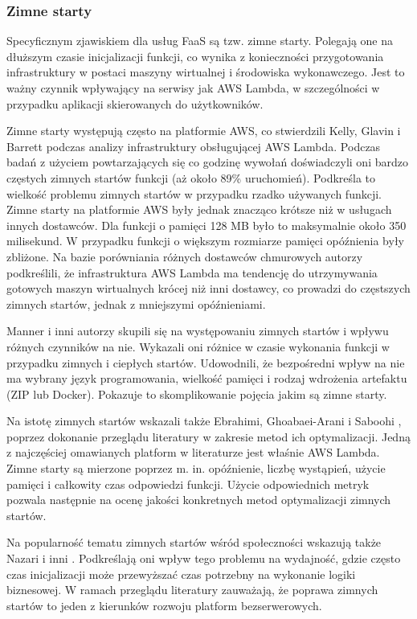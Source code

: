 \subsubsection*{Zimne starty}

Specyficznym zjawiskiem dla usług FaaS są tzw. zimne starty. 
Polegają one na dłuższym czasie inicjalizacji funkcji, co wynika z konieczności przygotowania infrastruktury w postaci maszyny wirtualnej i środowiska wykonawczego. 
Jest to ważny czynnik wpływający na serwisy jak AWS Lambda, w szczególności w przypadku aplikacji skierowanych do użytkowników.

Zimne starty występują często na platformie AWS, co stwierdzili Kelly, Glavin i Barrett \cite{9284261} podczas analizy infrastruktury obsługującej AWS Lambda. 
Podczas badań z użyciem powtarzających się co godzinę wywołań doświadczyli oni bardzo częstych zimnych startów funkcji (aż około 89\% uruchomień). 
Podkreśla to wielkość problemu zimnych startów w przypadku rzadko używanych funkcji. 
Zimne starty na platformie AWS były jednak znacząco krótsze niż w usługach innych dostawców. 
Dla funkcji o pamięci 128 MB było to maksymalnie około 350 milisekund. 
W przypadku funkcji o większym rozmiarze pamięci opóźnienia były zbliżone. 
Na bazie porówniania różnych dostawców chmurowych autorzy podkreślili, że infrastruktura AWS Lambda ma tendencję do utrzymywania gotowych maszyn wirtualnych krócej niż inni dostawcy, co prowadzi do częstszych zimnych startów, jednak z mniejszymi opóźnieniami.

Manner i inni autorzy \cite{8605777} skupili się na występowaniu zimnych startów i wpływu różnych czynników na nie. 
Wykazali oni różnice w czasie wykonania funkcji w przypadku zimnych i ciepłych startów. 
Udowodnili, że bezpośredni wpływ na nie ma wybrany język programowania, wielkość pamięci i rodzaj wdrożenia artefaktu (ZIP lub Docker). 
Pokazuje to skomplikowanie pojęcia jakim są zimne starty.

Na istotę zimnych startów wskazali także Ebrahimi, Ghoabaei-Arani i Saboohi \cite{EBRAHIMI2024103115}, poprzez dokonanie przeglądu literatury w zakresie metod ich optymalizacji. 
Jedną z najczęściej omawianych platform w literaturze jest właśnie AWS Lambda. 
Zimne starty są mierzone poprzez m. in. opóźnienie, liczbę wystąpień, użycie pamięci i całkowity czas odpowiedzi funkcji. 
Użycie odpowiednich metryk pozwala następnie na ocenę jakości konkretnych metod optymalizacji zimnych startów.

Na popularność tematu zimnych startów wśród społeczności wskazują także Nazari i inni \cite{9732138}.
Podkreślają oni wpływ tego problemu na wydajność, gdzie często czas inicjalizacji może przewyższać czas potrzebny na wykonanie logiki biznesowej.
W ramach przeglądu literatury zauważają, że poprawa zimnych startów to jeden z kierunków rozwoju platform bezserwerowych.

